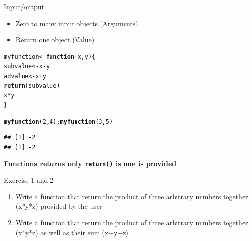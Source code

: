 \documentclass{beamer}\usepackage[]{graphicx}\usepackage[]{color}
\makeatletter
\newcommand{\hlnum}[1]{\textcolor[rgb]{0.686,0.059,0.569}{#1}}%
\newcommand{\hlopt}[1]{\textcolor[rgb]{0,0,0}{#1}}%
\newcommand{\hlstd}[1]{\textcolor[rgb]{0.345,0.345,0.345}{#1}}%
\newcommand{\hlkwa}[1]{\textcolor[rgb]{0.161,0.373,0.58}{\textbf{#1}}}%
\newcommand{\hlkwb}[1]{\textcolor[rgb]{0.69,0.353,0.396}{#1}}%
\newcommand{\hlkwc}[1]{\textcolor[rgb]{0.333,0.667,0.333}{#1}}%
\newcommand{\hlkwd}[1]{\textcolor[rgb]{0.737,0.353,0.396}{\textbf{#1}}}%
\newenvironment{kframe}{%
 \def\at@end@of@kframe{}%
 \ifinner\ifhmode%
  \def\at@end@of@kframe{\end{minipage}}%
  \begin{minipage}{\columnwidth}%
 \fi\fi%
 \def\FrameCommand##1{\hskip\@totalleftmargin \hskip-\fboxsep
 \colorbox{shadecolor}{##1}\hskip-\fboxsep
     \hskip-\linewidth \hskip-\@totalleftmargin \hskip\columnwidth}%
 \MakeFramed {\advance\hsize-\width
   \@totalleftmargin\z@ \linewidth\hsize
   \@setminipage}}%
 {\par\unskip\endMakeFramed%
 \at@end@of@kframe}
\newenvironment{knitrout}{}{} %
\makeatother
\begin{document}
\begin{frame}[fragile]{Input/output}

\begin{block}{}
  \begin{itemize}
  \item Zero to many input objects (Arguments)
  \item Return one object (Value)
  \end{itemize}
\end{block}

\begin{knitrout}
\color{fgcolor}\begin{kframe}
\begin{alltt}
\hlstd{myfunction} \hlkwb{<-} \hlkwa{function}\hlstd{(}\hlkwc{x}\hlstd{,} \hlkwc{y}\hlstd{)\{}
  \hlstd{subvalue} \hlkwb{<-} \hlstd{x}\hlopt{-}\hlstd{y}
  \hlstd{advalue} \hlkwb{<-} \hlstd{x}\hlopt{+}\hlstd{y}
  \hlkwd{return}\hlstd{(subvalue)}
  \hlstd{x}\hlopt{*}\hlstd{y}
\hlstd{\}}

\hlkwd{myfunction}\hlstd{(}\hlnum{2}\hlstd{,} \hlnum{4}\hlstd{);} \hlkwd{myfunction}\hlstd{(}\hlnum{3}\hlstd{,} \hlnum{5}\hlstd{)}
\end{alltt}
\begin{verbatim}
## [1] -2
## [1] -2
\end{verbatim}
\end{kframe}
\end{knitrout}

\textbf{Functions returns only \texttt{return()} is one is provided}
\end{frame}

\begin{frame}{Exercise 1 and 2}

\begin{enumerate}
  \item Write a function that return the product of three arbitrary numbers together (x*y*z) provided by the user
  \item Write a function that return the product of three arbitrary numbers together (x*y*z) as well as their sum (x+y+z)
\end{enumerate}

\end{frame}
\end{document}
